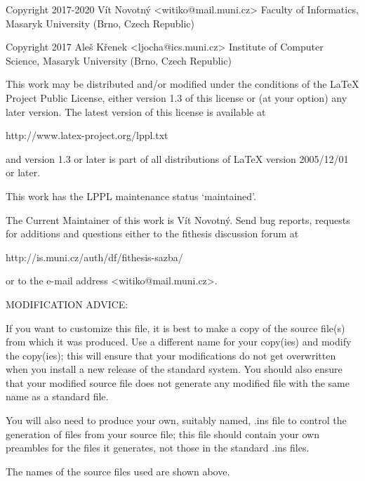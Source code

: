 
\preamble

Copyright 2017-2020  Vít Novotný <witiko@mail.muni.cz>
Faculty of Informatics, Masaryk University (Brno, Czech Republic)

Copyright 2017  Aleš Křenek <ljocha@ics.muni.cz>
Institute of Computer Science, Masaryk University (Brno, Czech Republic)

This work may be distributed and/or modified under the
conditions of the LaTeX Project Public License, either version
1.3 of this license or (at your option) any later version.
The latest version of this license is available at

  http://www.latex-project.org/lppl.txt

and version 1.3 or later is part of all distributions of LaTeX
version 2005/12/01 or later.

This work has the LPPL maintenance status `maintained'.

The Current Maintainer of this work is Vít Novotný.
Send bug reports, requests for additions and questions
either to the fithesis discussion forum at

  http://is.muni.cz/auth/df/fithesis-sazba/

or to the e-mail address <witiko@mail.muni.cz>.


MODIFICATION ADVICE:

If you want to customize this file, it is best to make a copy of
the source file(s) from which it was produced.  Use a different
name for your copy(ies) and modify the copy(ies); this will ensure
that your modifications do not get overwritten when you install a
new release of the standard system.  You should also ensure that
your modified source file does not generate any modified file with
the same name as a standard file.

You will also need to produce your own, suitably named, .ins file to
control the generation of files from your source file; this file
should contain your own preambles for the files it generates, not
those in the standard .ins files.

The names of the source files used are shown above.

\endpreamble
\askforoverwritefalse
